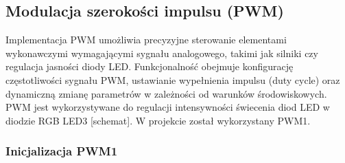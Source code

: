 \subsection{Modulacja szerokości impulsu (PWM)}
Implementacja PWM umożliwia precyzyjne sterowanie elementami wykonawczymi wymagającymi sygnału analogowego, takimi jak silniki czy regulacja jasności diody LED. Funkcjonalność obejmuje konfigurację częstotliwości sygnału PWM, ustawianie wypełnienia impulsu (duty cycle) oraz dynamiczną zmianę parametrów w zależności od warunków środowiskowych. PWM jest wykorzystywane do regulacji intensywności świecenia diod LED w diodzie RGB LED3 [schemat]. %
W projekcie został wykorzystany PWM1.

\subsubsection{Inicjalizacja PWM1}
